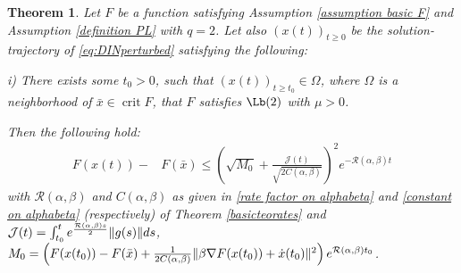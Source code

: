 \documentclass[reqno]{amsart}
\theoremstyle{plain}
\newtheorem{theorem}{Theorem}	%
\theoremstyle{definition}
\theoremstyle{remark}
\DeclareMathOperator{\crit}{crit}	%
\DeclarePairedDelimiter{\norm}{\lVert}{\rVert}	%
\newcommand{\Jb}{\mathcal{J}}
\newcommand{\Rb}{\mathcal{R}}
\begin{document}




\begin{theorem}\label{basicteo2inexact}
	Let $F$ be a function satisfying Assumption \ref{assumption basic F} and Assumption \ref{definition PL} with $q=2$. Let also $\left(x(t)\right)_{t\geq 0}$ be the solution-trajectory of \eqref{eq:DINperturbed} satisfying the following:
	
	i) There exists some $t_{0}>0$, such that  $\left(x(t)\right)_{t\geq t_{0}} \in \Omega$,  where $\Omega$ is a neighborhood of $\bar{x}\in\crit{F}$, that $F$ satisfies $\Lb(2)$ with $\mu>0$.
	
	Then the following hold:
	\begin{equation}\label{estimate gap perturbed 2}
		\begin{aligned}
			F(x(t))- & F(\bar{x})  \leq \left(\sqrt{M_{0}} + \frac{\Jb(t)}{\sqrt{2C(\alpha,\beta)}}\right)^{2}e^{-\Rb(\alpha,\beta)t}
		\end{aligned}
	\end{equation}
with $\Rb(\alpha,\beta)$ and $C(\alpha,\beta)$ as given in \eqref{rate factor on alphabeta} and \eqref{constant on alphabeta} (respectively) of Theorem \ref{basicteorates}
and $\Jb(t) = \int_{t_{0}}^{t}e^{\frac{\Rb(\alpha,\beta)s}{2}}\norm{g(s)}ds$, 
$M_{0}=\left(F(x(t_{0}))-F(\bar{x}) +\frac{1}{2C(\alpha,\beta)}\norm{\beta\nabla F(x(t_{0}))+\dot{x}(t_{0})}^{2}\right)e^{\Rb(\alpha,\beta)t_{0}}$.


\end{theorem}
\end{document}
